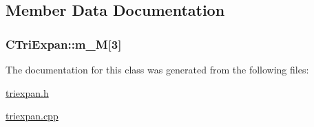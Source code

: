 \subsection{Member Data Documentation}
\hypertarget{classCTriExpan_af8c7f3af976ff622b46ed050a1b3624d}{
\subsubsection[{m\-\_\-\-M}]{ C\-Tri\-Expan\-::m\-\_\-\-M\mbox{[}3\mbox{]}\hspace{0.3cm}{\ttfamily [protected]}}}\label{classCTriExpan_af8c7f3af976ff622b46ed050a1b3624d}


The documentation for this class was generated from the following files\-:\begin{DoxyCompactItemize}
\item 
\hyperlink{triexpan_8h}{triexpan.\-h}\item 
\hyperlink{triexpan_8cpp}{triexpan.\-cpp}\end{DoxyCompactItemize}
